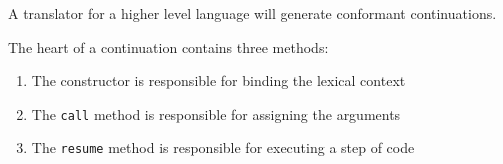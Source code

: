 \documentclass[oneside]{book}
\begin{document}
A translator for a higher level language will generate conformant
continuations.

The heart of a continuation contains three methods:
\begin{enumerate}
\item The constructor is responsible for binding the lexical context
\item The \verb$call$ method is responsible for assigning the arguments
\item The \verb$resume$ method is responsible for executing a step of code
\end{enumerate}
\end{document}
